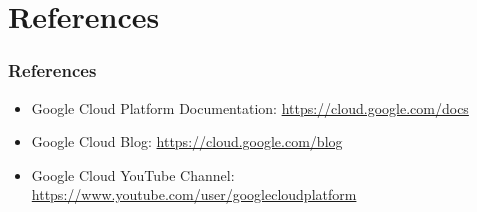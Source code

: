 \section{References}

\begin{frame}[fragile]\frametitle{References}
  \begin{itemize}
    \item Google Cloud Platform Documentation: \url{https://cloud.google.com/docs}
    \item Google Cloud Blog: \url{https://cloud.google.com/blog}
    \item Google Cloud YouTube Channel: \url{https://www.youtube.com/user/googlecloudplatform}
  \end{itemize}
\end{frame}
